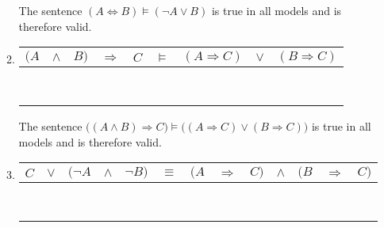 \begin{enumerate}
\begin{enumerate}
The sentence $(A \Leftrightarrow B) \vDash (\neg A \lor B)$ is true in all models and is therefore valid.

\item
\begin{tabular}{ccccc|c|ccc}
$(A$ & $\land$ & $B)$ & $\Rightarrow$ & $C$ & $\vDash$ & $(A \Rightarrow C)$ & $\lor$ & $(B \Rightarrow C)$\\
\hline
\F & \F & \F & \T & \F & \T & \T & \T & \T\\
\F & \F & \F & \T & \T & \T & \T & \T & \T\\
\F & \F & \T & \T & \F & \T & \T & \T & \F\\
\F & \F & \T & \T & \T & \T & \T & \T & \T\\
\T & \F & \F & \T & \F & \T & \F & \T & \T\\
\T & \F & \F & \T & \T & \T & \T & \T & \T\\
\T & \T & \T & \F & \F & \T & \F & \F & \F\\
\T & \T & \T & \T & \T & \T & \T & \T & \T\\
\end{tabular}

The sentence $\big((A \land B) \Rightarrow C\big) \vDash \big((A \Rightarrow C) \lor (B \Rightarrow C)\big)$ is true in all models and is therefore valid.

\item
\begin{tabular}{ccccc|c|ccccccc}
$C$ & $\lor$ & $(\neg A$ & $\land$ & $\neg B)$ & $\equiv$ & $(A$ & $\Rightarrow$ & $C)$ & $\land$ & $(B$ & $\Rightarrow$ & $C)$\\
\hline
\F & \T & \T & \T & \T & \T & \F & \T & \F & \T & \F & \T & \F \\
\T & \T & \T & \T & \T & \T & \F & \T & \T & \T & \F & \T & \T \\
\F & \F & \T & \F & \F & \T & \F & \T & \F & \F & \T & \F & \F \\
\T & \T & \T & \F & \F & \T & \F & \T & \T & \T & \T & \T & \T \\
\F & \F & \F & \F & \T & \T & \T & \F & \F & \F & \F & \T & \F \\
\T & \T & \F & \F & \T & \T & \T & \T & \T & \T & \F & \T & \T \\
\F & \F & \F & \F & \F & \T & \T & \F & \F & \F & \T & \F & \F \\
\T & \T & \F & \F & \F & \T & \T & \T & \T & \T & \T & \T & \T \\
\end{tabular}


\end{enumerate}
\end{enumerate}
